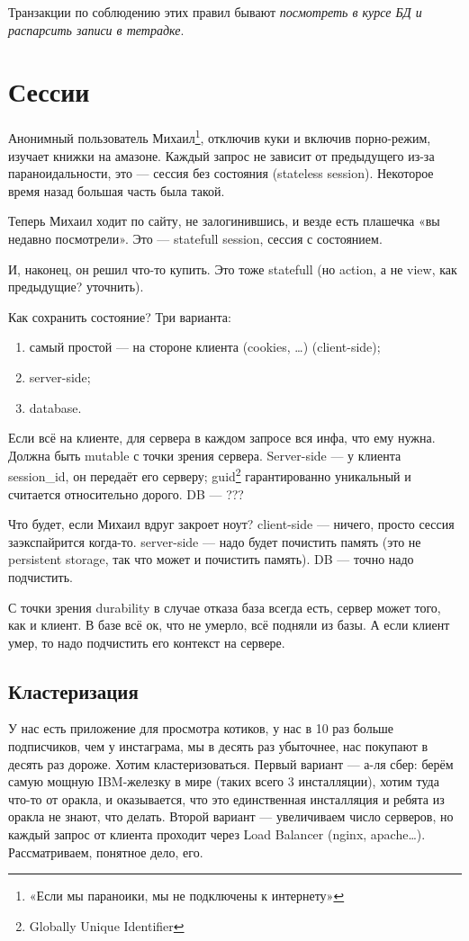 \documentclass[11pt,a4paper]{article}
\begin{document}
Транзакции по соблюдению этих правил бывают \textit{посмотреть в курсе БД и распарсить записи в тетрадке}.

\section{Сессии}
Анонимный пользователь Михаил\footnote{«Если мы параноики, мы не подключены к интернету»}, отключив куки и включив порно-режим, изучает книжки на амазоне. Каждый запрос не зависит от предыдущего из-за параноидальности, это — сессия без состояния (stateless session). Некоторое время назад большая часть была такой.

Теперь Михаил ходит по сайту, не залогинившись, и везде есть плашечка «вы недавно посмотрели». Это — statefull session, сессия с состоянием.

И, наконец, он решил что-то купить. Это тоже statefull (но action, а не view, как предыдущие? уточнить).

Как сохранить состояние? Три варианта:
\begin{enumerate}
\item самый простой — на стороне клиента (cookies, …) (client-side);
\item server-side;
\item database.
\end{enumerate}

Если всё на клиенте, для сервера в каждом запросе вся инфа, что ему нужна. Должна быть mutable с точки зрения сервера. Server-side — у клиента session\_id, он передаёт его серверу; guid\footnote{Globally Unique Identifier} гарантированно уникальный и считается относительно дорого. DB — ???

Что будет, если Михаил вдруг закроет ноут? client-side — ничего, просто сессия заэкспайрится когда-то. server-side — надо будет почистить память (это не persistent storage, так что может и почистить память). DB — точно надо подчистить.

С точки зрения durability в случае отказа база всегда есть, сервер может того, как и клиент. В базе всё ок, что не умерло, всё подняли из базы. А если клиент умер, то надо подчистить его контекст на сервере.

\subsection{Кластеризация}
У нас есть приложение для просмотра котиков, у нас в 10 раз больше подписчиков, чем у инстаграма, мы в десять раз убыточнее, нас покупают в десять раз дороже. Хотим кластеризоваться. Первый вариант — а-ля сбер: берём самую мощную IBM-железку в мире (таких всего 3 инсталляции), хотим туда что-то от оракла, и оказывается, что это единственная инсталляция и ребята из оракла не знают, что делать. Второй вариант — увеличиваем число серверов, но каждый запрос от клиента проходит через Load Balancer (nginx, apache…). Рассматриваем, понятное дело, его.
\end{document}
